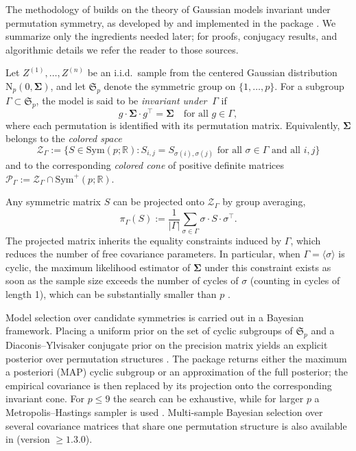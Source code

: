 The methodology of  builds on the theory of Gaussian models invariant under permutation symmetry, as developed by \citet{10.1214/22-AOS2174} and implemented in the  package \citep{JSSv112i07}. We summarize only the ingredients needed later; for proofs, conjugacy results, and algorithmic details we refer the reader to those sources.

Let \(Z^{(1)},\ldots,Z^{(n)}\) be an i.i.d.~sample from the centered Gaussian distribution \(\mathrm{N}_p(0,\boldsymbol{\Sigma})\), and let \(\mathfrak{S}_p\) denote the symmetric group on \(\{1,\ldots,p\}\). For a subgroup \(\Gamma\subset\mathfrak{S}_p\), the model is said to be \emph{invariant under} \(\ \Gamma\) if
\[
g\cdot\boldsymbol{\Sigma}\cdot g^\top = \boldsymbol{\Sigma}
\quad\text{for all } g\in\Gamma,
\]
where each permutation is identified with its permutation matrix. Equivalently, \(\boldsymbol{\Sigma}\) belongs to the \emph{colored space}
\[
\mathcal{Z}_{\Gamma}
:=
\bigl\{
S\in\mathrm{Sym}(p;\mathbb{R})
:
S_{i,j}=S_{\sigma(i),\sigma(j)}
\text{ for all }\sigma\in\Gamma
\text{ and all }i,j
\bigr\}
\]
and to the corresponding \emph{colored cone} of positive definite matrices \(\mathcal{P}_{\Gamma}:=\mathcal{Z}_{\Gamma}\cap\mathrm{Sym}^+(p;\mathbb{R})\).

Any symmetric matrix \(S\) can be projected onto \(\mathcal{Z}_{\Gamma}\) by group averaging,
\[
\pi_{\Gamma}(S)
:=
\frac{1}{|\Gamma|}
\sum_{\sigma\in\Gamma}
\sigma\cdot S\cdot\sigma^\top.
\]
The projected matrix inherits the equality constraints induced by \(\Gamma\), which reduces the number of free covariance parameters. In particular, when \(\Gamma=\langle\sigma\rangle\) is cyclic, the maximum likelihood estimator of \(\boldsymbol{\Sigma}\) under this constraint exists as soon as the sample size exceeds the number of cycles of \(\sigma\) (counting in cycles of length 1), which can be substantially smaller than \(p\) \citep{JSSv112i07}.

Model selection over candidate symmetries is carried out in a Bayesian framework. Placing a uniform prior on the set of cyclic subgroups of \(\mathfrak{S}_p\) and a Diaconis--Ylvisaker conjugate prior on the precision matrix \citep{diaconis1979conjugate} yields an explicit posterior over permutation structures \citep{10.1214/22-AOS2174}. The  package returns either the maximum a posteriori (MAP) cyclic subgroup or an approximation of the full posterior; the empirical covariance is then replaced by its projection onto the corresponding invariant cone. For \(p\le 9\) the search can be exhaustive, while for larger \(p\) a Metropolis--Hastings sampler is used \citep{JSSv112i07}. Multi-sample Bayesian selection over several covariance matrices that share one permutation structure is also available in  (version \(\ge 1.3.0\)).

